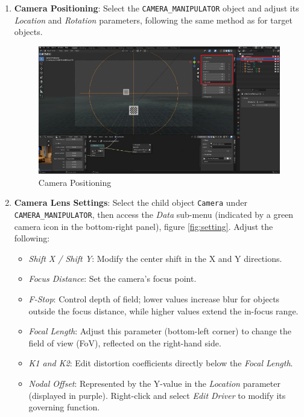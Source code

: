 \begin{enumerate}
    \item \textbf{Camera Positioning}: Select the \texttt{CAMERA\_MANIPULATOR} object and adjust its \textit{Location} and \textit{Rotation} parameters, following the same method as for target objects.
    \begin{figure}[h]
        \centering
        \includegraphics[width=\textwidth]{Images/03edgedetect/3.png}
        \caption{Camera Positioning}
    \end{figure}
    \item \textbf{Camera Lens Settings}: Select the child object \texttt{Camera} under \texttt{CAMERA\_MANIPULATOR}, then access the \textit{Data} sub-menu (indicated by a green camera icon in the bottom-right panel), figure \ref{fig:setting}. Adjust the following:
    \begin{itemize}
        \item \textit{Shift X / Shift Y}: Modify the center shift in the X and Y directions.
        \item \textit{Focus Distance}: Set the camera’s focus point.
        \item \textit{F-Stop}: Control depth of field; lower values increase blur for objects outside the focus distance, while higher values extend the in-focus range.
        \item \textit{Focal Length}: Adjust this parameter (bottom-left corner) to change the field of view (FoV), reflected on the right-hand side.
        \item \textit{K1 and K2}: Edit distortion coefficients directly below the \textit{Focal Length}.
        \item \textit{Nodal Offset}: Represented by the Y-value in the \textit{Location} parameter (displayed in purple). Right-click and select \textit{Edit Driver} to modify its governing function.
    \end{itemize}

\end{enumerate}
